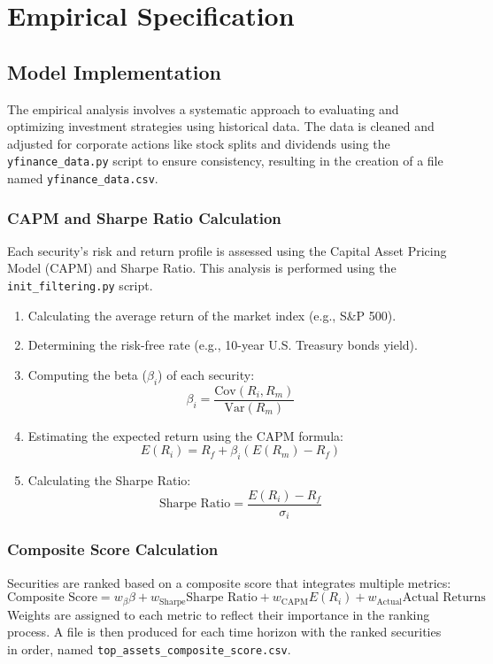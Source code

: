 \section{Empirical Specification}

\subsection{Model Implementation}
The empirical analysis involves a systematic approach to evaluating and optimizing investment strategies using historical data. The data is cleaned and adjusted for corporate actions like stock splits and dividends using the \texttt{yfinance\_data.py} script to ensure consistency, resulting in the creation of a file named \texttt{yfinance\_data.csv}.

\subsubsection{CAPM and Sharpe Ratio Calculation}
Each security's risk and return profile is assessed using the Capital Asset Pricing Model (CAPM) and Sharpe Ratio. This analysis is performed using the \texttt{init\_filtering.py} script.
\begin{enumerate}
    \item Calculating the average return of the market index (e.g., S\&P 500).
    \item Determining the risk-free rate (e.g., 10-year U.S. Treasury bonds yield).
    \item Computing the beta (\(\beta_i\)) of each security:
    \begin{equation}
        \beta_i = \frac{\text{Cov}(R_i, R_m)}{\text{Var}(R_m)}
    \end{equation}
    \item Estimating the expected return using the CAPM formula:
    \begin{equation}
        E(R_i) = R_f + \beta_i (E(R_m) - R_f)
    \end{equation}
    \item Calculating the Sharpe Ratio:
    \begin{equation}
        \text{Sharpe Ratio} = \frac{E(R_i) - R_f}{\sigma_i}
    \end{equation}
\end{enumerate}

\subsubsection{Composite Score Calculation}
Securities are ranked based on a composite score that integrates multiple metrics:
\begin{equation}
    \text{Composite Score} = w_{\beta} \beta + w_{\text{Sharpe}} \text{Sharpe Ratio} + w_{\text{CAPM}} E(R_i) + w_{\text{Actual}} \text{Actual Returns}
\end{equation}
Weights are assigned to each metric to reflect their importance in the ranking process. A file is then produced for each time horizon with the ranked securities in order, named \texttt{top\_assets\_composite\_score.csv}.

